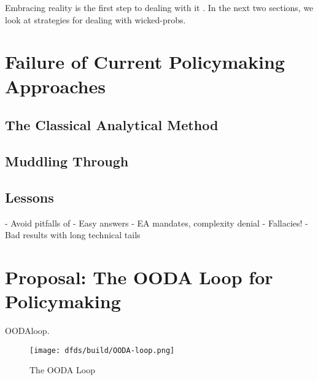 Embracing reality is the first step to dealing with it \cite{baker_2019}. In the next two sections, we look at
strategies for dealing with \acp{wicked-prob}.


\section{Failure of Current Policymaking Approaches}

\subsection{The Classical Analytical Method}

\subsection{Muddling Through}


\subsection{Lessons}

- Avoid pitfalls of
  - Easy answers
    - EA mandates, complexity denial
  - Fallacies!
  - Bad results with long technical tails


\section{Proposal: The OODA Loop for Policymaking}

\ac{OODAloop}.

\begin{figure}[h]
    \centering\CaptionFontSize
    \texttt{[image: dfds/build/OODA-loop.png]}
    \caption[The OODA Loop]{The OODA Loop}
    \label{fig-ooda-loop}
\end{figure}

